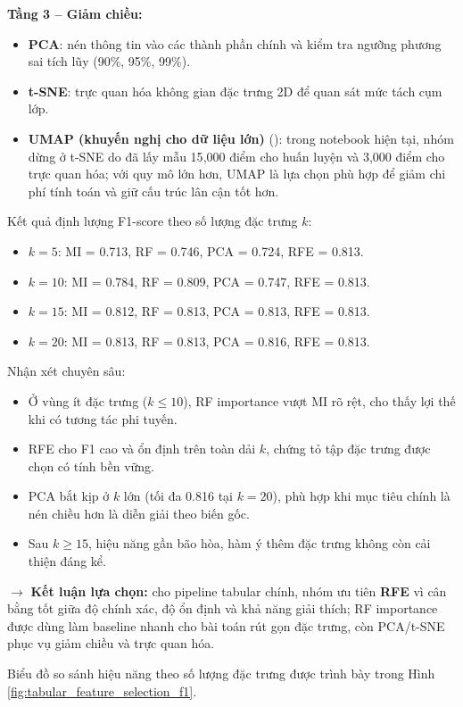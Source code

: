 \textbf{Tầng 3 -- Giảm chiều:}
\begin{itemize}
    \item \textbf{PCA}: nén thông tin vào các thành phần chính và kiểm tra ngưỡng phương sai tích lũy (90\%, 95\%, 99\%).
    \item \textbf{t-SNE}: trực quan hóa không gian đặc trưng 2D để quan sát mức tách cụm lớp.
    \item \textbf{UMAP (khuyến nghị cho dữ liệu lớn)} (\cite{mcinnes2018umap}): trong notebook hiện tại, nhóm dừng ở t-SNE do đã lấy mẫu 15{,}000 điểm cho huấn luyện và 3{,}000 điểm cho trực quan hóa; với quy mô lớn hơn, UMAP là lựa chọn phù hợp để giảm chi phí tính toán và giữ cấu trúc lân cận tốt hơn.
\end{itemize}

Kết quả định lượng F1-score theo số lượng đặc trưng $k$:
\begin{itemize}
    \item $k=5$: MI = 0.713, RF = 0.746, PCA = 0.724, RFE = 0.813.
    \item $k=10$: MI = 0.784, RF = 0.809, PCA = 0.747, RFE = 0.813.
    \item $k=15$: MI = 0.812, RF = 0.813, PCA = 0.813, RFE = 0.813.
    \item $k=20$: MI = 0.813, RF = 0.813, PCA = 0.816, RFE = 0.813.
\end{itemize}

Nhận xét chuyên sâu:
\begin{itemize}
    \item Ở vùng ít đặc trưng ($k\leq10$), RF importance vượt MI rõ rệt, cho thấy lợi thế khi có tương tác phi tuyến.
    \item RFE cho F1 cao và ổn định trên toàn dải $k$, chứng tỏ tập đặc trưng được chọn có tính bền vững.
    \item PCA bắt kịp ở $k$ lớn (tối đa 0.816 tại $k=20$), phù hợp khi mục tiêu chính là nén chiều hơn là diễn giải theo biến gốc.
    \item Sau $k\geq15$, hiệu năng gần bão hòa, hàm ý thêm đặc trưng không còn cải thiện đáng kể.
\end{itemize}

$\rightarrow$ \textbf{Kết luận lựa chọn:} cho pipeline tabular chính, nhóm ưu tiên \textbf{RFE} vì cân bằng tốt giữa độ chính xác, độ ổn định và khả năng giải thích; RF importance được dùng làm baseline nhanh cho bài toán rút gọn đặc trưng, còn PCA/t-SNE phục vụ giảm chiều và trực quan hóa.

Biểu đồ so sánh hiệu năng theo số lượng đặc trưng được trình bày trong Hình \ref{fig:tabular_feature_selection_f1}.


